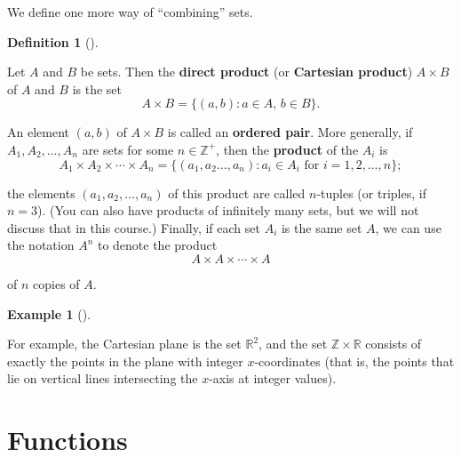 \documentclass[10pt,]{book}
\newcommand{\terminology}[1]{\textbf{#1}}
\theoremstyle{plain}
\theoremstyle{definition}
\newtheorem{definition}[theorem]{Definition}
\theoremstyle{definition}
\theoremstyle{definition}
\newtheorem{example}[theorem]{Example}
\theoremstyle{definition}
\numberwithin{equation}{section}
\def\Z{\mathbb{Z}}
\def\R{\mathbb{R}}
\begin{document}
    We define one more way of ``combining'' sets.
\begin{definition}[{}]\label{definition-7}

        Let \(A\) and \(B\) be sets. Then the \terminology{direct product} (or \terminology{Cartesian 
        product}) \(A\times B\) of \(A\) and \(B\) is the set
\begin{equation*}
A\times B =\{(a,b): \text{\(a\in A\), \(b\in B\)} \}.
\end{equation*}

\par

        An element \((a,b)\) of
        \(A\times B\) is called an \terminology{ordered pair}. More generally, if
        \(A_1, A_2, \ldots, A_n\) are sets for some \(n\in \Z^+\), then the
        \terminology{product} of the \(A_i\) is
\begin{equation*}
A_1\times A_2 \times \cdots \times A_n=\{(a_1, a_2 \ldots, a_n): a_i \in A_i \text{ for
          } i=1,2, \ldots, n\}; 
\end{equation*}

        the elements \((a_1,a_2,\ldots,a_n)\) of this
        product are called \(n\)-tuples (or triples, if \(n=3\)). (You can also have products of infinitely many sets, but we will
        not discuss that in this course.) Finally, if each set \(A_i\) is
        the same set \(A\), we can use the notation \(A^n\) to denote the
        product
\begin{equation*}
A\times A \times \cdots \times A
\end{equation*}

        of \(n\) copies of
        \(A\).
\label{notation-22}
\end{definition}
\begin{example}[]\label{example-4}

        For example, the Cartesian plane is the set \(\R^2\), and the set \(\Z \times \R\) consists of exactly the points in the plane with integer \(x\)-coordinates
        (that is, the points that lie on vertical lines intersecting the \(x\)-axis at integer values).
\end{example}
\typeout{************************************************}
\typeout{************************************************}
\section[{Functions}]{Functions}\label{section-2}
\end{document}
